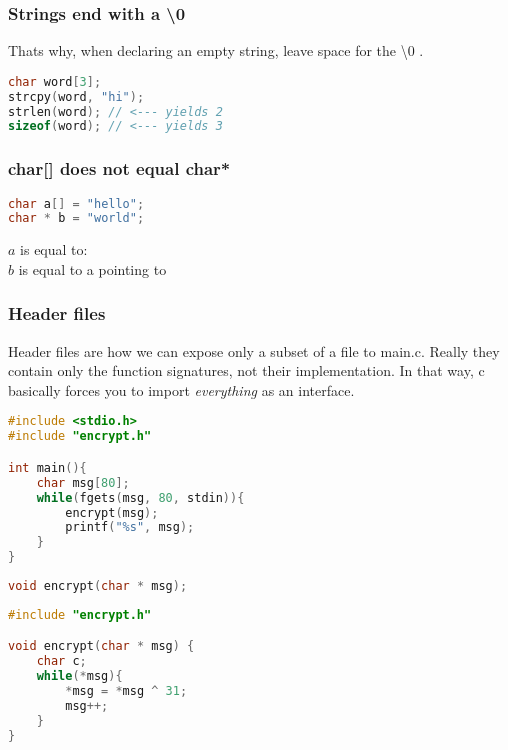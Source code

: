 \subsubsection{Strings end with a \textbackslash 0}

Thats why, when declaring an empty string, leave space for the \textbackslash 0 .

\begin{lstlisting}[language=c]
char word[3];
strcpy(word, "hi");
strlen(word); // <--- yields 2
sizeof(word); // <--- yields 3
\end{lstlisting}


\subsubsection{char[] does not equal char*}

\begin{lstlisting}[language=c]
char a[] = "hello";
char * b = "world";
\end{lstlisting}

$a$ is equal to:       \\
$b$ is equal to a  pointing to      




\subsubsection{Header files}

Header files are how we can expose only a subset of a file to main.c. Really they contain only the function signatures, not their implementation. In that way, c basically forces you to import \emph{everything} as an interface. 


\begin{lstlisting}[language=c,caption={main.c}]
#include <stdio.h>
#include "encrypt.h"

int main(){
    char msg[80];
    while(fgets(msg, 80, stdin)){
        encrypt(msg);
        printf("%s", msg);
    }
}
\end{lstlisting}


\begin{lstlisting}[language=c,caption={encrypt.h}]
void encrypt(char * msg);
\end{lstlisting}


\begin{lstlisting}[language=c,caption={encrypt.c}]
#include "encrypt.h"

void encrypt(char * msg) {
    char c;
    while(*msg){
        *msg = *msg ^ 31;
        msg++;
    }
}
\end{lstlisting}



